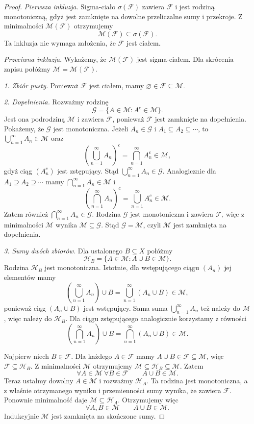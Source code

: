\begin{proof}
\emph{Pierwsza inkluzja.}
Sigma-ciało $\sigma(\mathcal{F})$ zawiera $\mathcal{F}$ i jest rodziną
monotoniczną, gdyż jest zamknięte na dowolne przeliczalne sumy
i przekroje. Z minimalności $\mathcal{M}(\mathcal{F})$ otrzymujemy
\[
  \mathcal{M}(\mathcal{F})\subseteq\sigma(\mathcal{F}).
\]
Ta inkluzja nie wymaga założenia, że $\mathcal{F}$ jest ciałem.

\emph{Przeciwna inkluzja.}
Wykażemy, że $\mathcal{M}(\mathcal{F})$ jest sigma-ciałem.
Dla skrócenia zapisu połóżmy $\mathcal{M}=\mathcal{M}(\mathcal{F})$.

\emph{1. Zbiór pusty.}
Ponieważ $\mathcal{F}$ jest ciałem, mamy
$\varnothing\in\mathcal{F}\subseteq\mathcal{M}$.

\emph{2. Dopełnienia.}
Rozważmy rodzinę
\[
  \mathcal{G}=\{A\in\mathcal{M}:A^c\in\mathcal{M}\}.
\]
Jest ona podrodziną $\mathcal{M}$ i zawiera $\mathcal{F}$, ponieważ
$\mathcal{F}$ jest zamknięte na dopełnienia.
Pokażemy, że $\mathcal{G}$ jest monotoniczna.
Jeżeli $A_n\in\mathcal{G}$ i $A_1\subseteq A_2\subseteq\cdots$,
to $\bigcup_{n=1}^{\infty}A_n\in\mathcal{M}$ oraz
\[
  \left(\bigcup_{n=1}^{\infty}A_n\right)^c
  =\bigcap_{n=1}^{\infty}A_n^c\in\mathcal{M},
\]
gdyż ciąg $(A_n^c)$ jest zstępujący.
Stąd $\bigcup_{n=1}^{\infty}A_n\in\mathcal{G}$.
Analogicznie dla $A_1\supseteq A_2\supseteq\cdots$ mamy
$\bigcap_{n=1}^{\infty}A_n\in\mathcal{M}$ i
\[
  \left(\bigcap_{n=1}^{\infty}A_n\right)^c
  =\bigcup_{n=1}^{\infty}A_n^c\in\mathcal{M}.
\]
Zatem również $\bigcap_{n=1}^{\infty}A_n\in\mathcal{G}$.
Rodzina $\mathcal{G}$ jest monotoniczna i zawiera $\mathcal{F}$,
więc z minimalności $\mathcal{M}$ wynika
$\mathcal{M}\subseteq\mathcal{G}$. Stąd $\mathcal{G}=\mathcal{M}$,
czyli $\mathcal{M}$ jest zamknięta na dopełnienia.

\emph{3. Sumy dwóch zbiorów.}
Dla ustalonego $B\subseteq X$ połóżmy
\[
  \mathcal{H}_B=\{A\in\mathcal{M}:A\cup B\in\mathcal{M}\}.
\]
Rodzina $\mathcal{H}_B$ jest monotoniczna. Istotnie, dla wstępującego
ciągu $(A_n)$ jej elementów mamy
\[
  \left(\bigcup_{n=1}^{\infty}A_n\right)\cup B
  =\bigcup_{n=1}^{\infty}(A_n\cup B)\in\mathcal{M},
\]
ponieważ ciąg $(A_n\cup B)$ jest wstępujący.
Sama suma $\bigcup_{n=1}^{\infty}A_n$ też należy do $\mathcal{M}$,
więc należy do $\mathcal{H}_B$.
Dla ciągu zstępującego analogicznie korzystamy z równości
\[
  \left(\bigcap_{n=1}^{\infty}A_n\right)\cup B
  =\bigcap_{n=1}^{\infty}(A_n\cup B)\in\mathcal{M}.
\]

Najpierw niech $B\in\mathcal{F}$.
Dla każdego $A\in\mathcal{F}$ mamy
$A\cup B\in\mathcal{F}\subseteq\mathcal{M}$, więc
$\mathcal{F}\subseteq\mathcal{H}_B$.
Z minimalności $\mathcal{M}$ otrzymujemy
$\mathcal{M}\subseteq\mathcal{H}_B\subseteq\mathcal{M}$.
Zatem
\[
  \forall A\in\mathcal{M}\ \forall B\in\mathcal{F}
  \qquad A\cup B\in\mathcal{M}.
\]
Teraz ustalmy dowolny $A\in\mathcal{M}$ i rozważmy
$\mathcal{H}_A$. Ta rodzina jest monotoniczna, a z właśnie
otrzymanego wyniku i przemienności sumy wynika, że zawiera
$\mathcal{F}$. Ponownie minimalność daje
$\mathcal{M}\subseteq\mathcal{H}_A$. Otrzymujemy więc
\[
  \forall A,B\in\mathcal{M}\qquad A\cup B\in\mathcal{M}.
\]
Indukcyjnie $\mathcal{M}$ jest zamknięta na skończone sumy.


\end{proof}
